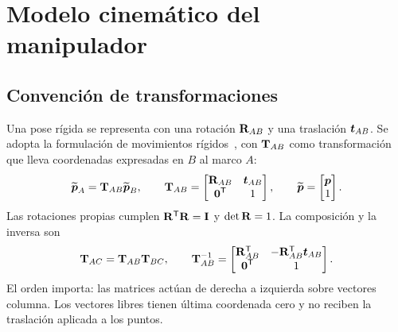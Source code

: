 \chapter{Modelo cinemático del manipulador}
\label{cap:brazo}

\section{Convención de transformaciones}
Una pose rígida se representa con una rotación $\mathbf{R}_{AB}$ y una traslación $\boldsymbol{t}_{AB}$. Se adopta la formulación de movimientos rígidos~\cite{lynch}, con $\mathbf{T}_{AB}$ como transformación que lleva coordenadas expresadas en $B$ al marco $A$:
\begin{equation}
\widetilde{\boldsymbol{p}}_A=\mathbf{T}_{AB}\widetilde{\boldsymbol{p}}_B,
\qquad
\mathbf{T}_{AB}=\begin{bmatrix}
\mathbf{R}_{AB}&\boldsymbol{t}_{AB}\\\boldsymbol{0}^{\mathsf{T}}&1
\end{bmatrix},
\qquad \widetilde{\boldsymbol{p}}=\begin{bmatrix}\boldsymbol{p}\\1\end{bmatrix}.
\end{equation}
Las rotaciones propias cumplen $\mathbf{R}^{\mathsf{T}}\mathbf{R}=\mathbf{I}$ y $\det\mathbf{R}=1$. La composición y la inversa son
\begin{equation}
\mathbf{T}_{AC}=\mathbf{T}_{AB}\mathbf{T}_{BC},\qquad
\mathbf{T}_{AB}^{-1}=\begin{bmatrix}
\mathbf{R}_{AB}^{\mathsf{T}}&-\mathbf{R}_{AB}^{\mathsf{T}}\boldsymbol{t}_{AB}\\
\boldsymbol{0}^{\mathsf{T}}&1
\end{bmatrix}.
\end{equation}
El orden importa: las matrices actúan de derecha a izquierda sobre vectores columna. Los vectores libres tienen última coordenada cero y no reciben la traslación aplicada a los puntos.

